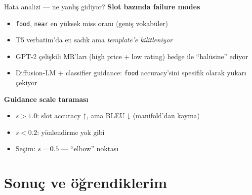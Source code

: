 \documentclass[10pt,aspectratio=169]{beamer}
\begin{document}
\begin{frame}{Hata analizi --- ne yanlış gidiyor?}
  \textbf{Slot bazında failure modes}
  \begin{itemize}
    \item \texttt{food}, \texttt{near} en yüksek miss oranı (geniş vokabüler)
    \item T5 verbatim'da en sadık ama \emph{template'e kilitleniyor}
    \item GPT-2 çelişkili MR'ları (high price + low rating) hedge ile
          ``halüsine'' ediyor
    \item Diffusion-LM + classifier guidance: \texttt{food} accuracy'sini
          spesifik olarak yukarı çekiyor
  \end{itemize}

  \vspace{0.6em}
  \textbf{Guidance scale taraması}
  \begin{itemize}
    \item $s > 1.0$: slot accuracy ↑, ama BLEU ↓ (manifold'dan kayma)
    \item $s < 0.2$: yönlendirme yok gibi
    \item Seçim: $s = 0.5$ --- ``elbow'' noktası
  \end{itemize}
\end{frame}

\section{Sonuç ve öğrendiklerim}
\end{document}
